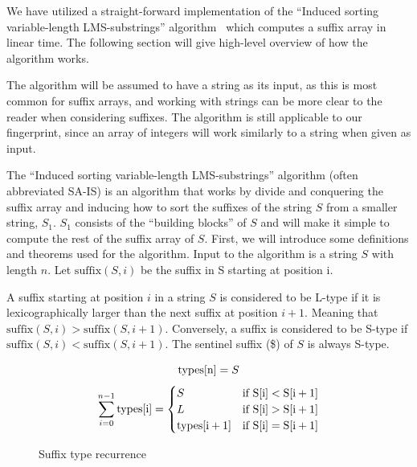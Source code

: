 We have utilized a straight-forward implementation of the ``Induced sorting
variable-length LMS-substrings'' algorithm~\cite{LinearTimeSuffixArraySAIS} which computes
a suffix array in linear time. The following section will give high-level overview of how
the algorithm works. 

The algorithm will be assumed to have a string as its input, as this is most common for
suffix arrays, and working with strings can be more clear to the reader when considering
suffixes. The algorithm is still applicable to our fingerprint, since an array of integers
will work similarly to a string when given as input.

The ``Induced sorting variable-length LMS-substrings'' algorithm (often abbreviated SA-IS)
is an algorithm that works by divide and conquering the suffix array and inducing how to
sort the suffixes of the string $S$ from a smaller string, $S_1$. $S_1$ consists of the
``building blocks'' of $S$ and will make it simple to compute the rest of the suffix array
of $S$. First, we will introduce some definitions and theorems used for the algorithm.
Input to the algorithm is a string $S$ with length $n$. Let $\mathrm{suffix}(S, i)$ be the
suffix in S starting at position i.

\begin{definition} A suffix starting at position $i$ in a
    string $S$ is considered to be L-type if it is lexicographically larger than the next
    suffix at position $i + 1$. Meaning that $\mathrm{suffix}(S, i) > \mathrm{suffix}(S,
    i+1)$. Conversely, a suffix is considered to be S-type if $\mathrm{suffix}(S, i) <
    \mathrm{suffix}(S, i+1)$. The sentinel suffix (\$) of $S$ is always S-type.
\end{definition}



\begin{figure}[t]
    \begin{center}
	$$
        \mathrm{types}[{\mathrm{n}}] = S
	$$
	$$
        \sum^{n - 1}_{i = 0}\mathrm{types}[{\mathrm{i}}] =
        \begin{cases}
            S & \textrm{if\ } \mathrm{S}[{\mathrm{i}}] < \mathrm{S}[{\mathrm{i + 1}}] \\
            L & \textrm{if\ } \mathrm{S}[{\mathrm{i}}] > \mathrm{S}[{\mathrm{i + 1}}] \\
            \mathrm{types}[{\mathrm{i + 1}}] & \textrm{if\ } \mathrm{S}[{\mathrm{i}}] = \mathrm{S}[{\mathrm{i + 1}}] 
        \end{cases}
	$$

	\caption{Suffix type recurrence}
	\label{eq:suffixtypesrecurrence}
    \end{center}
\end{figure}


